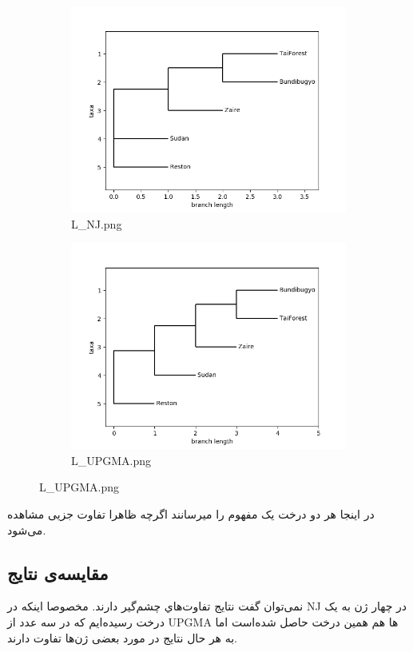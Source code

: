 \documentclass[11pt]{article}
\begin{document}
\begin{figure}[H]
  \centering
  \begin{subfigure}[b]{0.4\linewidth}
    \includegraphics[width=\linewidth]{../Data/Trees/L_NJ.png}
    \caption{L\_NJ.png}
  \end{subfigure}
  \begin{subfigure}[b]{0.4\linewidth}
    \includegraphics[width=\linewidth]{../Data/Trees/L_UPGMA.png}
    \caption{L\_UPGMA.png}
  \end{subfigure}
\end{figure}
در اینجا هر دو درخت یک مفهوم را میرسانند اگرچه ظاهرا تفاوت جزیی مشاهده می‌شود.
\newpage
\subsection{مقایسه‌ی نتایج}
نمی‌توان گفت نتایج تفاوت‌ها‌ي چشم‌گیر دارند. مخصوصا اینکه در NJ در چهار ژن به یک درخت رسیده‌ایم که در سه عدد از UPGMA ‌ها هم همین درخت حاصل شده‌است اما به هر حال نتایج در مورد بعضی‌ ‌ژن‌ها تفاوت دارند.
\end{document}
